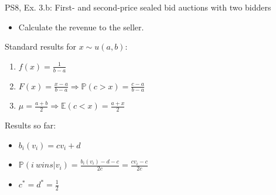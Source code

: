 \begin{frame}{PS8, Ex. 3.b: First- and second-price sealed bid auctions with two bidders}
    \begin{multicols}{2}
      \begin{itemize}
        \item[(b)] Calculate the revenue to the seller.
      \end{itemize}
      \vfill\null\columnbreak
      Standard results for $x\sim u(a, b):$
      \vspace{-6pt}
      \begin{enumerate}
        \item[PDF:] $f(x)=\frac{1}{b-a}$
        \item[CDF:] $F(x)=\frac{x-a}{b-a}\Rightarrow\mathbb{P}(c>x)=\frac{c-a}{b-a}$
        \item[Mean:] $\mu=\frac{a+b}{2}\Rightarrow\mathbb{E}(c<x)=\frac{a+x}{2}$
      \end{enumerate}
      \vspace{-6pt}
      Results so far:
      \vspace{-6pt}
      \begin{itemize}
        \item[($*$)]  $b_i(v_i) = cv_i+d$
        \item[($**$)] $\mathbb{P}(i\ wins|v_i)=\frac{b_i(v_i)-d-c}{2c}=\frac{cv_i-c}{2c}$
        \item[(3.a)]    $c^*=d^*=\frac{1}{2}$
      \end{itemize}
      \vfill\null
    \end{multicols}
\end{frame}
